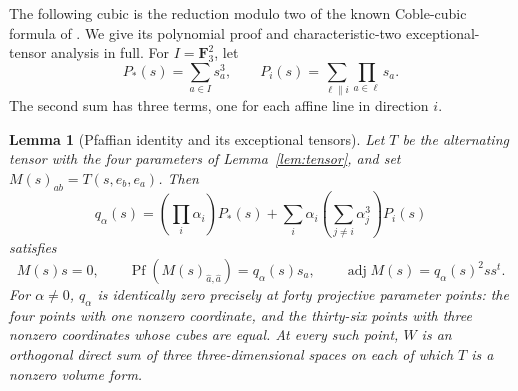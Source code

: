 \documentclass[11pt]{article}
\newtheorem{lemma}[theorem]{Lemma}
\theoremstyle{definition}\newtheorem{definition}[theorem]{Definition}
\theoremstyle{remark}\newtheorem{remark}[theorem]{Remark}
\newcommand{\FF}{\mathbf F}
\begin{document}
The following cubic is the reduction modulo two of the known Coble-cubic formula of \citet[equation~(3.9), author version p.~14]{GrusonSam}. We give its polynomial proof and characteristic-two exceptional-tensor analysis in full. For $I=\FF_3^2$, let
\[
 P_*(s)=\sum_{a\in I}s_a^3,\qquad
 P_i(s)=\sum_{\ell\parallel i}\prod_{a\in\ell}s_a.
\]
The second sum has three terms, one for each affine line in direction $i$.

\begin{lemma}[Pfaffian identity and its exceptional tensors]\label{lem:pfaffian}
Let $T$ be the alternating tensor with the four parameters of Lemma~\ref{lem:tensor}, and set $M(s)_{ab}=T(s,e_b,e_a)$. Then
\begin{equation}\label{eq:q}
 q_\alpha(s)=\left(\prod_i\alpha_i\right)P_*(s)
 +\sum_i\alpha_i\left(\sum_{j\ne i}\alpha_j^3\right)P_i(s)
\end{equation}
satisfies
\[
 M(s)s=0,\qquad
 \operatorname{Pf}(M(s)_{\widehat a,\widehat a})=q_\alpha(s)s_a,
 \qquad\operatorname{adj}M(s)=q_\alpha(s)^2ss^t.
\]
For $\alpha\ne0$, $q_\alpha$ is identically zero precisely at forty projective parameter points: the four points with one nonzero coordinate, and the thirty-six points with three nonzero coordinates whose cubes are equal. At every such point, $W$ is an orthogonal direct sum of three three-dimensional spaces on each of which $T$ is a nonzero volume form.
\end{lemma}
\end{document}
